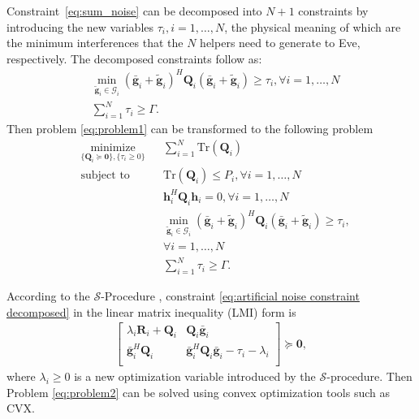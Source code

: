 \documentclass[journal]{IEEEtran}
\begin{document}
Constraint~\eqref{eq:sum_noise} can be decomposed into $N+1$ constraints by introducing the new variables $\tau_i, i =1,\ldots,N$, the physical meaning of which are the minimum interferences that the $N$ helpers need to generate to Eve, respectively. The decomposed constraints follow as:
\begin{eqnarray}
&\underset{\tilde{\mathbf{g}}_i \in \mathcal{G}_i }\min(\bar{\mathbf{g}}_i+\tilde{\mathbf{g}}_i)^H\mathbf{Q}_i(\bar{\mathbf{g}}_i+\tilde{\mathbf{g}}_i) \geq  \tau_i, \forall i = 1,\ldots,N\label{eq:artificial noise constraint decomposed}\\
&\sum_{i =1}^{N}\tau_i \geq \Gamma.\nonumber
\end{eqnarray}
Then problem \eqref{eq:problem1} can be transformed to the following problem
\begin{equation}
\begin{aligned} \label{eq:problem2}
& \underset{\{\mathbf{Q}_i \succeq \mathbf{0}\},\{\tau_i \geq 0\}}{\text{minimize}}
& & \sum_{i = 1}^{N}\mathrm{Tr}(\mathbf{Q}_i) \\
& \text{subject to}
& & \mathrm{Tr}(\mathbf{Q}_i) \leq P_i, \forall i = 1, \ldots, N\\
&&& \mathbf{h}_i^H \mathbf{Q}_i \mathbf{h}_i= 0, \forall i = 1,\ldots,N\\
&&& \min_{\tilde{\mathbf{g}}_i \in \mathcal{G}_i}(\bar{\mathbf{g}}_i+\tilde{\mathbf{g}}_i)^H\mathbf{Q}_i(\bar{\mathbf{g}}_i+\tilde{\mathbf{g}}_i) \geq  \tau_i,\\
&&&\forall i = 1,\ldots,N\\
&&&\sum_{i =1}^{N}\tau_i \geq \Gamma.
\end{aligned}
\end{equation}

According to the $\mathcal{S}$-Procedure \cite{ConvexOpt_Boyd}, constraint \eqref{eq:artificial noise constraint decomposed}  in the linear matrix inequality (LMI) form is
\begin{eqnarray}
\left[ {\begin{array}{cc}
	\lambda_i\mathbf{R}_i+\mathbf{Q}_i  & \mathbf{Q}_i\bar{\mathbf{g}}_i \\
	\bar{\mathbf{g}}_i^H\mathbf{Q}_i& \bar{\mathbf{g}}_i^H\mathbf{Q}_i\bar{\mathbf{g}} _i- \tau_i -\lambda_i\\
	\end{array} } \right] \succeq \mathbf{0},
\end{eqnarray}
where $\lambda_i \geq 0$ is a new optimization variable introduced by the $\mathcal{S}$-procedure. Then Problem \eqref{eq:problem2} can be solved using convex optimization tools such as CVX\cite{cvx}.
\end{document}
